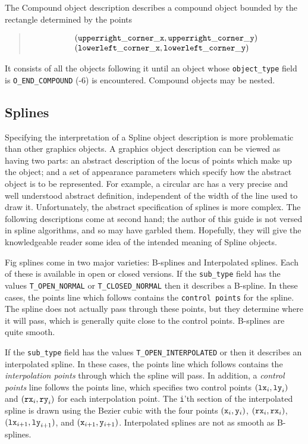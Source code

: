 The Compound object description describes a compound object
	bounded by the rectangle determined by the points
%
\begin{quote}
\[ \begin{array}{l}
	({\tt upperright\_corner\_x}, {\tt upperright\_corner\_y})	\\
	({\tt lowerleft\_corner\_x}, {\tt lowerleft\_corner\_y})
\end{array} \]
\end{quote}
%
It consists of all the objects following it until an object whose
	{\tt object\_type} field is {\tt O\_END\_COMPOUND} (-6) is encountered.
Compound objects may be nested.

\subsection{Splines}
\label{s:splines}

Specifying the interpretation of a Spline object description is more problematic
	than other graphics objects.
A graphics object description can be viewed as having two parts:
	an abstract description of the locus of points which
	make up the object; and a set of appearance parameters
	which specify how the abstract object is to be represented.
For example, a circular arc has a very precise and well understood abstract
	definition, independent of the width of the line used to
	draw it.
Unfortunately, the abstract specification of splines is more complex.
The following descriptions come at second hand; the author of this
	guide is not versed in spline algorithms, and so
	may have garbled them.
Hopefully, they will give the knowledgeable reader some idea of the
	intended meaning of Spline objects.

Fig splines come in two major varieties: B-splines and Interpolated splines.
Each of these is available in open or closed versions.
If the {\tt sub\_type} field has the values {\tt T\_OPEN\_NORMAL}
	or {\tt T\_CLOSED\_NORMAL} then it describes a B-spline.
In these cases, the points line which follows contains the
	{\tt control points} for the spline.
The spline does not actually pass through these points, but they determine
	where it will pass, which is generally quite close to the control
	points.
B-splines are quite smooth.

If the {\tt sub\_type} field has the values {\tt T\_OPEN\_INTERPOLATED}	or
	 then it describes an
	interpolated spline.
In these cases, the points line which follows contains the
	{\em interpolation points} through which the spline will pass.
In addition, a {\em control points} line follows the points line,
	which specifies two control points $({\tt lx}_i, {\tt ly}_i)$ and
	$({\tt rx}_i, {\tt ry}_i)$ for each interpolation point.
The {\tt i}'th section of the interpolated spline is drawn using the
	Bezier cubic with the four points
	$({\tt x}_i, {\tt y}_i)$,  \linebreak $({\tt rx}_i, {\tt rx}_i)$,
	$({\tt lx}_{i+1}, {\tt ly}_{i+1})$,
	and $({\tt x}_{i+1}, {\tt y}_{i+1})$.
Interpolated splines are not as smooth as B-splines.

